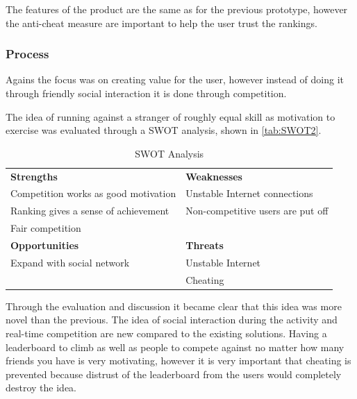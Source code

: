 The features of the product are the same as for the previous prototype, however the anti-cheat measure are important to help the user trust the rankings.

\subsubsection{Process}
Agains the focus was on creating value for the user, however instead of doing it through friendly social interaction it is done through competition. 

The idea of running against a stranger of roughly equal skill as motivation to exercise was evaluated through a \ac{SWOT} analysis, shown in \autoref{tab:SWOT2}.

\begin{table}[!ht]
	\begin{tabular}{| l | l |}
		\hline
		\textbf{Strengths} & \textbf{Weaknesses} \\ 
		Competition works as good motivation & Unstable Internet connections \\ 
		Ranking gives a sense of achievement & Non-competitive users are put off \\
		Fair competition & \\ \hline
		\textbf{Opportunities} & \textbf{Threats} \\ 
		Expand with social network & Unstable Internet \\
		& Cheating \\
		\hline
	\end{tabular}
	\caption{SWOT Analysis}
	\label{tab:SWOT2}
\end{table}

Through the evaluation and discussion it became clear that this idea was more novel than the previous. The idea of social interaction during the activity and real-time competition are new compared to the existing solutions. Having a leaderboard to climb as well as people to compete against no matter how many friends you have is very motivating, however it is very important that cheating is prevented because distrust of the leaderboard from the users would completely destroy the idea.

